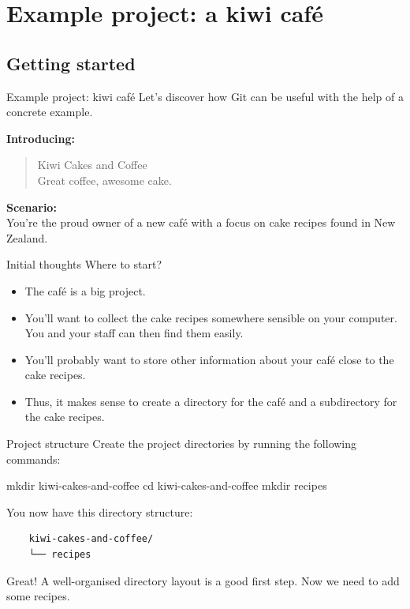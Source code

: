 \documentclass{git_course}
\begin{document}
\section{Example project: a kiwi café}

\subsection{Getting started}

\begin{frame}{Example project: kiwi café}
Let's discover how Git can be useful with the help of a concrete example.

    \textbf{Introducing:}
    \begin{quote}
        Kiwi Cakes and Coffee\\
        Great coffee, awesome cake.
    \end{quote}

    \textbf{Scenario:}\\
    You're the proud owner of a new café with a focus on cake recipes found
    in New Zealand.
\end{frame}

\begin{frame}{Initial thoughts}
Where to start?
    \begin{itemize}
        \item The café is a big project.
        \item You'll want to collect the cake recipes
            somewhere sensible on your computer.  You and your staff
            can then find them easily.
        \item You'll probably want to store other information about your
            café close to the cake recipes.
        \item Thus, it makes sense to create a directory for the café and a
            subdirectory for the cake recipes.
    \end{itemize}
\end{frame}

\begin{frame}[fragile]{Project structure}
Create the project directories by running the following commands:
\begin{shellcode}
    mkdir kiwi-cakes-and-coffee
    cd kiwi-cakes-and-coffee
    mkdir recipes
\end{shellcode}

You now have this directory structure:
\begin{verbatim}
    kiwi-cakes-and-coffee/
    └── recipes
\end{verbatim}

    Great!  A well-organised directory layout is a good first step.  Now we
    need to add some recipes.
\end{frame}
\end{document}
